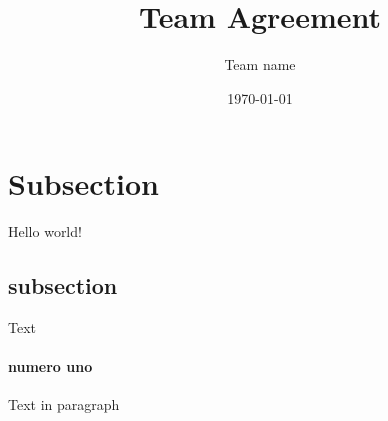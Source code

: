 \documentclass{article}
\title{Team Agreement}
\date{\today}
\author{Team name}
\begin{document}
    
    \newpage

    \section{Subsection}
    Hello world!
    \subsection{subsection}
    Text
    \paragraph{numero uno}
    Text in paragraph
\end{document}
